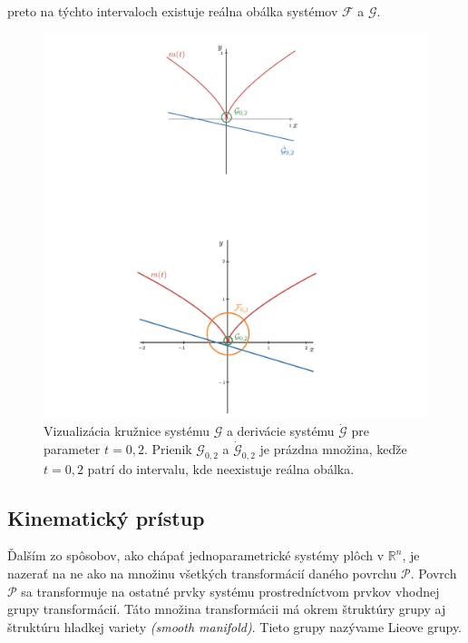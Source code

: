 preto na týchto intervaloch existuje reálna obálka systémov $\mathcal{F}$ a $\mathcal{G}$.
\begin{figure}[h]
	\centering
	\includegraphics[trim={3cm 13.5cm 0cm 0.5cm},clip]{images/cyklograficke.pdf}
	\caption[Reálnosť obálky.]{Vizualizácia kružnice systému $\mathcal{G}$ a derivácie systému $\mathcal{\dot{G}}$ pre parameter $t=0,2$. Prienik $\mathcal{G}_{0,2}$ a $\mathcal{\dot{G}}_{0,2}$ je prázdna množina, keďže $t=0,2$ patrí do intervalu, kde neexistuje reálna obálka.}
	\label{fig:cykloraficke}
\end{figure}

\subsection{Kinematický prístup}
Ďalším zo spôsobov, ako chápať jednoparametrické systémy plôch v $\mathbb{R}^n$, je nazerať na ne ako na množinu všetkých transformácií daného povrchu $\mathcal{P}$. Povrch $\mathcal{P}$ sa transformuje na ostatné prvky systému prostredníctvom prvkov vhodnej grupy transformácií. Táto množina transformácii má okrem štruktúry grupy aj štruktúru hladkej variety \textit{(smooth manifold)}. Tieto grupy nazývame Lieove grupy.

